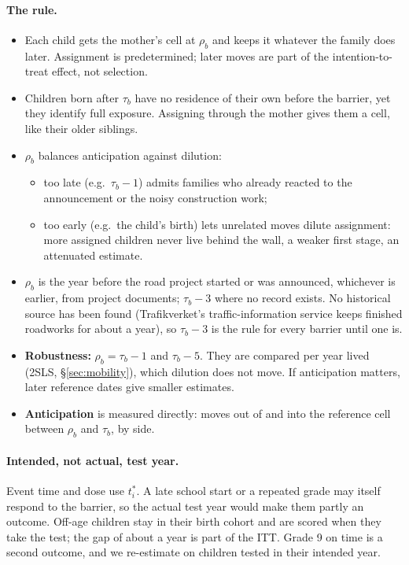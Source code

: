 \documentclass[11pt]{article}
\begin{document}
\paragraph{The rule.}
\begin{itemize}
\item Each child gets the mother's cell at \(\rho_b\) and keeps it whatever the family does
  later. Assignment is predetermined; later moves are part of the intention-to-treat effect,
  not selection.
\item Children born after \(\tau_b\) have no residence of their own before the barrier, yet
  they identify full exposure. Assigning through the mother gives them a cell, like their
  older siblings.
\item \(\rho_b\) balances anticipation against dilution:
  \begin{itemize}
  \item too late (e.g.\ \(\tau_b - 1\)) admits families who already reacted to the
    announcement or the noisy construction work;
  \item too early (e.g.\ the child's birth) lets unrelated moves dilute assignment: more
    assigned children never live behind the wall, a weaker first stage, an attenuated estimate.
  \end{itemize}
\item \(\rho_b\) is the year before the road project started or was announced, whichever is
  earlier, from project documents; \(\tau_b - 3\) where no record exists. No historical source
  has been found (Trafikverket's traffic-information service keeps finished roadworks for about
  a year), so \(\tau_b - 3\) is the rule for every barrier until one is.
\item \textbf{Robustness:} \(\rho_b = \tau_b - 1\) and \(\tau_b - 5\). They are compared per
  year lived (2SLS, \S\ref{sec:mobility}), which dilution does not move. If anticipation
  matters, later reference dates give smaller estimates.
\item \textbf{Anticipation} is measured directly: moves out of and into the reference cell
  between \(\rho_b\) and \(\tau_b\), by side.
\end{itemize}

\paragraph{Intended, not actual, test year.} Event time and dose use \(t^*_i\). A late school
start or a repeated grade may itself respond to the barrier, so the actual test year would make
them partly an outcome. Off-age children stay in their birth cohort and are scored when they
take the test; the gap of about a year is part of the ITT. Grade 9 on time is a second outcome,
and we re-estimate on children tested in their intended year.
\end{document}
